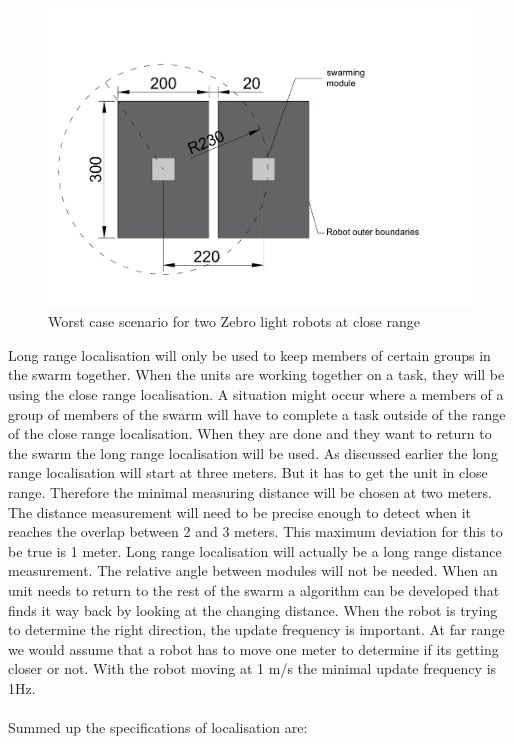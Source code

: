 \documentclass[10pt,a4paper]{article}
\begin{document}
\begin{figure}[H]
        \centering
        \graphicspath{ {./images/} }
        \includegraphics[scale=.3]{smrange.pdf}
        \caption{Worst case scenario for two Zebro light robots at close range}
        \label{fig:smrange}
\end{figure}


Long range localisation will only be used to keep members of certain groups in the swarm together. When the units are working together on a task, they will be using the close range localisation. A situation might occur where a members of a group of members of the swarm will have to complete a task outside of the range of the close range localisation. When they are done and they want to return to the swarm the long range localisation will be used. As discussed earlier the long range localisation will start at three meters. But it has to get the unit in close range. Therefore the minimal measuring distance will be chosen at two meters. The distance measurement will need to be precise enough to detect when it reaches the overlap between 2 and 3 meters. This maximum deviation for this to be true is 1 meter. Long range localisation will actually be a long range distance measurement. The relative angle between modules will not be needed. When an unit needs to return to the rest of the swarm a algorithm can be developed that finds it way back by looking at the changing distance. When the robot is trying to determine the right direction, the update frequency is important. At far range we would assume that a robot has to move one meter to determine if its getting closer or not. With the robot moving at 1 m/s the minimal update frequency is 1Hz. \\\\
Summed up the specifications of localisation are:
\end{document}
